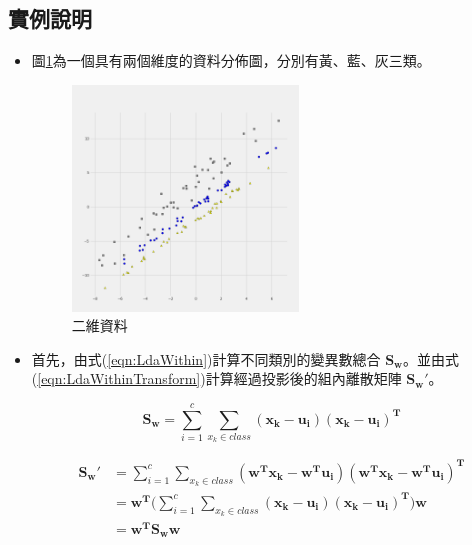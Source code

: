 \subsection{實例說明}
\begin{itemize}
	\item
	      圖\ref{fig:LdaDemostrate}為一個具有兩個維度的資料分佈圖，分別有黃、藍、灰三類。
	      \begin{figure}[h]
		      \centering
		      \includegraphics[width=6cm]{pic/lda_dataset.png}
		      \caption{二維資料}
		      \label{fig:LdaDemostrate}
	      \end{figure}


	\item
	      首先，由式(\ref{eqn:LdaWithin})計算不同類別的變異數總合 \(\mathbf{S_w}\)。並由式(\ref{eqn:LdaWithinTransform})計算經過投影後的組內離散矩陣 \(\mathbf{{S_w}'}\)。


	      \begin{equation}
		      \label{eqn:LdaWithin}
		      \mathbf{S_w}  =\sum_{i=1}^{c} \sum^{}_{x_k\in class}  \mathbf{(x_k - u_i)(x_k-u_i)^T}
	      \end{equation}

	      \begin{equation}
		      \label{eqn:LdaWithinTransform}
		      \begin{aligned}
			      \mathbf{{S_w}'} & =\sum_{i=1}^{c} \sum^{}_{x_k\in class}  \mathbf{(w^Tx_k - w^Tu_i)(w^Tx_k-w^Tu_i)^T}
			      \\& =\mathbf{w^T}(\sum_{i=1}^{c} \sum^{}_{x_k\in class} \mathbf{ (x_k - u_i)(x_k-u_i)^T)w}
			      \\& =\mathbf{w^TS_ww}
		      \end{aligned}
	      \end{equation}



\end{itemize}

